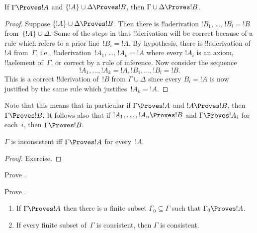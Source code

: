 \documentclass[../../../include/open-logic-section]{subfiles}
\begin{document}
\begin{prop}[Transitivity]
If $\Gamma \Proves !A$ and $\{!A\} \cup \Delta \Proves
!B$, then $\Gamma \cup \Delta \Proves !B$.
\end{prop}

\begin{proof}
  Suppose $\{!A\} \cup \Delta \Proves !B$. Then there is
  !!a{derivation} $!B_1$, \dots, $!B_l = !B$ from~$\{!A\} \cup
  \Delta$. Some of the steps in that !!{derivation} will be correct
  because of a rule which refers to a prior line~$!B_i = !A$. By
  hypothesis, there is !!a{derivation} of~$!A$ from~$\Gamma$, i.e.,
  !!a{derivation}~$!A_1$, \dots, $!A_k = !A$ where every $!A_i$ is an
  axiom, !!a{element} of~$\Gamma$, or correct by a rule of
  inference. Now consider the sequence
  \[
  !A_1, \dots, !A_k = !A, !B_1, \dots, !B_l = !B.
  \]
  This is a correct !!{derivation} of~$!B$ from $\Gamma \cup \Delta$
  since every $B_i = !A$ is now justified by the same rule which
  justifies~$!A_k = !A$.
\end{proof}

Note that this means that in particular if $\Gamma \Proves !A$ and $!A
\Proves !B$, then $\Gamma \Proves !B$. It follows also that if $!A_1,
\dots, !A_n \Proves !B$ and $\Gamma \Proves !A_i$ for each~$i$, then
$\Gamma \Proves !B$.

\begin{prop}
$\Gamma$ is inconsistent iff $\Gamma \Proves !A$ for every~$!A$.
\end{prop}

\begin{proof}
Exercise.
\end{proof}

\begin{prob}
Prove .
\end{prob}
\tagendprob

\begin{prob}
Prove .
\end{prob}
\tagendprob

\begin{prop}[Compactness]
  \begin{enumerate}
  \item If $\Gamma \Proves !A$ then there is a finite subset $\Gamma_0
    \subseteq \Gamma$ such that $\Gamma_0 \Proves !A$.
  \item If every finite subset of~$\Gamma$ is
    consistent, then $\Gamma$ is consistent.
  \end{enumerate}
\end{prop}
\end{document}
